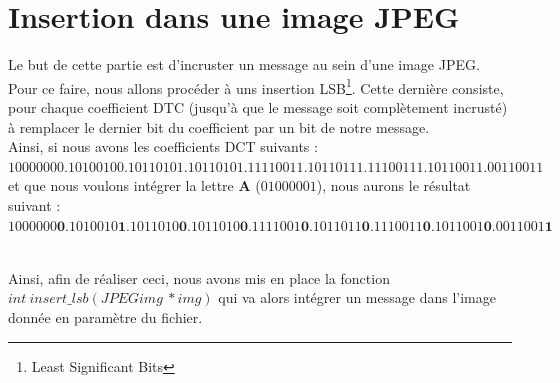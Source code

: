 \section{Insertion dans une image JPEG}
Le but de cette partie est d'incruster un message au sein d'une image JPEG. Pour ce faire, nous allons procéder à uns insertion LSB\footnote{Least Significant Bits}. Cette dernière consiste, pour chaque coefficient DTC (jusqu'à que le message soit complètement incrusté) à remplacer le dernier bit du coefficient par un bit de notre message.\\
Ainsi, si nous avons les coefficients DCT suivants :\\
$10000000.10100100.10110101.10110101.11110011.10110111.11100111.10110011.00110011$\\
et que nous voulons intégrer la lettre \textbf{A} ($01000001$), nous aurons le résultat suivant :\\
$1000000\textbf{0}.1010010\textbf{1}.1011010\textbf{0}.1011010\textbf{0}.1111001\textbf{0}.1011011\textbf{0}.1110011\textbf{0}.1011001\textbf{0}.0011001\textbf{1}$\\~\\\par
Ainsi, afin de réaliser ceci, nous avons mis en place la fonction $int~insert\_lsb(JPEGimg~*img)$ qui va alors intégrer un message dans l'image donnée en paramètre du fichier.
